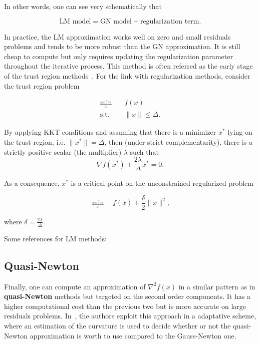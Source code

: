\documentclass[10pt]{article}
\numberwithin{equation}{section}
\begin{document}
	 In other words, one can see very schematically that
	 
	\[\text{LM model} = \text{GN model} + \text{regularization term}.\]
	
	In practice, the LM approximation works well on zero and small residuals problems and tends to be more robust than the GN approximation. It is still cheap to compute but only requires updating the regularization parameter throughout the iterative process. This method is often referred as the early stage of the trust region methods~\cite{conn-etal:2000}. For the link with regularization methods, consider the trust region problem
	 
	 \begin{equation*}
	 	\begin{aligned}
	 		\min_x \quad & f(x) \\
	 		\text{s.t.} \quad & \|x\| \le \Delta.
	 	\end{aligned}
	 \end{equation*}
	 
	 By applying KKT conditions and assuming that there is a minimizer $x^*$ lying on the trust region, i.e. $\|x^*\|=\Delta$, then (under strict complementarity), there is a strictly positive scalar (the multiplier) $\lambda$ such that
	 \[\nabla f(x^*) + \dfrac{2\lambda}{\Delta}x^*=0.\]
	 
	 As a consequence, $x^*$ is a critical point oh the unconstrained regularized problem
	 
	 \[\min_x \quad f(x) + \dfrac{\delta}{2} \|x\|^2,\]
	 
	 where $\delta=\frac{2\lambda}{\Delta}$.
	 
	 Some references for LM methods: \cite{bellavia-etal:2018}
	 
	 \subsection{Quasi-Newton}
	 
	 Finally, one can compute an approximation of $\nabla^2f(x)$ in a similar pattern as in \textbf{quasi-Newton} methods \cite[][Chapter 6]{nocedalwright:2006} but targeted on the second order components. It has a higher computational cost than the previous two but is more accurate on large residuals problems. In~\cite{dennisetal:1981}, the authors exploit this approach in a adaptative scheme, where an estimation of the curvature is used to decide whether or not the quasi-Newton approximation is worth to use compared to the Gauss-Newton one.
	 
\end{document}
